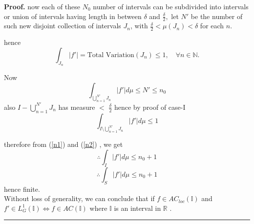 \documentclass[10pt,a4paper]{amsart}
\newenvironment{proof}[1][Proof]{\noindent\textbf{#1.} }{\
\rule{0.5em}{0.5em}}
\begin{document}
\begin{proof}
now each of these $N_0$ number of intervals can be subdivided into intervals or union of intervals having length in between $\delta$ and $\frac{\delta}{2},$  let $N'$ be the number of such new disjoint collection of intervals $J_n$, with 
$\frac{\delta}{2}<\mu(J_n)<\delta$ for each $n$.

hence
\[
\int_{J_n} |f'| = \text{Total Variation}(J_n) \leq 1, \quad \forall n\in \mathbb{N}.
\]

Now
\begin{equation}\label{n1}
\int_{\bigcup_{n=1}^{N'} J_n} |f'| d\mu\leq N'\leq n_0
\end{equation}
also $I-\bigcup_{n=1}^{N'} J_n$ has measure $<$ $\frac{\delta}{2}$
hence by proof of case-I
\begin{equation}\label{n2}
\int_{I\setminus\bigcup_{n=1}^{N'} J_n} |f'| d\mu\leq 1
\end{equation}

therefore from (\ref{n1}) and (\ref{n2}) , we get 
\[
\therefore \int_{I} |f'| d\mu\leq n_0+1
\]
\[
\therefore \int_{S} |f'| d\mu\leq n_0+1
\]
hence finite.
\\
Without loss of generality, we can conclude that if  $f\in AC_{loc}(\mathbb{I})$ and $f' \in L^1_G(\mathbb{I}) \iff f\in AC(\mathbb{I}) $ where $\mathbb{I}$ is an interval in $\mathbb{R}$ .
\end{proof}
\end{document}
